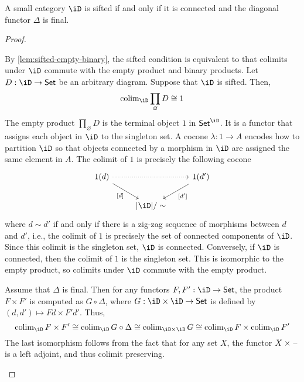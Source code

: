 \documentclass{zett}
\begin{document}
\begin{thm}\label{thm:characterization-of-sifted}
  A small category $\iD$ is sifted if and only if it is connected and the diagonal functor $\Delta$ is final.
\end{thm}
\begin{proof}
  \begin{node}
    By \cref{lem:sifted-empty-binary}, the sifted condition is equivalent to that colimits under $\iD$ commute with the empty product and binary products.
    Let $D : \iD \to \CSet$ be an arbitrary diagram.
    Suppose that $\iD$ is sifted.
    Then,
    \[
      \colim_{\iD}\prod_{\varnothing}D \iso 1
    \]
    The empty product $\prod_{\varnothing}D$ is the terminal object $1$ in $\CSet^{\iD}$.
    It is a functor that assigns each object in $\iD$ to the singleton set.
    A cocone $\lambda : 1 \to A$ encodes how to partition $\iD$ so that objects connected by a morphism in $\iD$ are assigned the same element in $A$.
    The colimit of $1$ is precisely the following cocone
    \[
      \begin{tikzcd}
	{1(d)} && {1(d')} \\
	& {|\iD|/\sim}
	\arrow["{[d]}"', from=1-1, to=2-2]
	\arrow["{[d']}", from=1-3, to=2-2]
	\arrow[dotted, from=1-1, to=1-3]
      \end{tikzcd}
    \]
    where $d \sim d'$ if and only if there is a zig-zag sequence of morphisms between $d$ and $d'$, i.e., the colimit of $1$ is precisely the set of connected components of $\iD$.
    Since this colimit is the singleton set, $\iD$ is connected.
    Conversely, if $\iD$ is connected, then the colimit of $1$ is the singleton set.
    This is isomorphic to the empty product, so colimits under $\iD$ commute with the empty product.
  \end{node}
  \begin{node}
    Assume that $\Delta$ is final.
    Then for any functors $F, F' : \iD \to \CSet$, the product $F \times F'$ is computed as $G \circ \Delta$, where $G : \iD \times \iD \to \CSet$ is defined by $(d, d') \mapsto Fd \times F'd'$.
    Thus,
    \[
      \colim_{\iD}F \times F' \iso \colim_{\iD}G \circ \Delta \iso \colim_{\iD \times \iD}G \iso \colim_{\iD}F \times \colim_{\iD}F'
    \]
    The last isomorphism follows from the fact that for any set $X$, the functor $X \times \mathord{\hspace{1pt}\text{--}\hspace{1pt}}$ is a left adjoint, and thus colimit preserving.

\end{node}
\end{proof}
\end{document}
